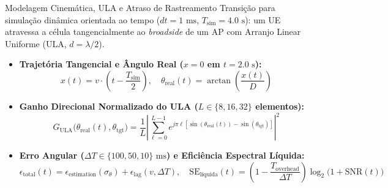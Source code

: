\documentclass{beamer}
\begin{document}
\begin{frame}{Modelagem Cinemática, ULA e Atraso de Rastreamento} 
    Transição para simulação dinâmica orientada ao tempo ($dt = 1\text{ ms}$, $T_{\text{sim}} = 4.0\text{ s}$): um UE atravessa a célula tangencialmente ao \textit{broadside} de um AP com Arranjo Linear Uniforme (ULA, $d = \lambda/2$). 

    \vspace{0.15cm}
    \begin{itemize}
        \item \textbf{Trajetória Tangencial e Ângulo Real ($x = 0$ em $t = 2.0\text{ s}$):} 
        $$x(t) = v \cdot \left(t - \frac{T_{\text{sim}}}{2}\right), \quad \theta_{\text{real}}(t) = \arctan\left(\frac{x(t)}{D}\right)$$ 
        \item \textbf{Ganho Direcional Normalizado do ULA ($L \in \{8, 16, 32\}$ elementos):} 
        $$G_{\text{ULA}}\big(\theta_{\text{real}}(t), \theta_{\text{tgt}}\big) = \frac{1}{L} \left| \sum_{\ell=0}^{L-1} e^{j \pi \ell \left[\sin(\theta_{\text{real}}(t)) - \sin(\theta_{\text{tgt}})\right]} \right|^2$$ 
        \item \textbf{Erro Angular ($\Delta T \in \{100, 50, 10\}\text{ ms}$) e Eficiência Espectral Líquida:} 
        $$\epsilon_{\text{total}}(t) = \epsilon_{\text{estimation}}(\sigma_\theta) + \epsilon_{\text{lag}}(v, \Delta T), \quad \text{SE}_{\text{líquida}}(t) = \left(1 - \frac{T_{\text{overhead}}}{\Delta T}\right) \log_2\big(1 + \text{SNR}(t)\big)$$ 
    \end{itemize}
\end{frame}
\end{document}

